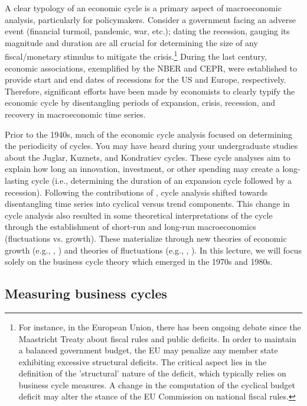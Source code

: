 \documentclass[a4paper,12pt]{article}%
\begin{document}
A clear typology of an economic cycle is a primary aspect of macroeconomic
analysis, particularly for policymakers. Consider a government facing an
adverse event (financial turmoil, pandemic, war, etc.); dating the recession,
gauging its magnitude and duration are all crucial for determining the size of
any fiscal/monetary stimulus to mitigate the crisis.\footnote{For instance, in
the European Union, there has been ongoing debate since the Maastricht Treaty
about fiscal rules and public deficits. In order to maintain a balanced
government budget, the EU may penalize any member state exhibiting excessive
structural deficits. The critical aspect lies in the definition of the
'structural' nature of the deficit, which typically relies on business cycle
measures. A change in the computation of the cyclical budget deficit may
alter the stance of the EU Commission on national fiscal rules.} During the
last century, economic associations, exemplified by the NBER and CEPR, were
established to provide start and end dates of recessions for the US and
Europe, respectively. Therefore, significant efforts have been made by
economists to clearly typify the economic cycle by disentangling periods of
expansion, crisis, recession, and recovery in macroeconomic time series.

Prior to the 1940s, much of the economic cycle analysis focused on determining
the periodicity of cycles. You may have heard during your undergraduate studies
about the Juglar, Kuznets, and Kondratiev cycles. These cycle analyses aim to
explain how long an innovation, investment, or other spending may create a
long-lasting cycle (i.e., determining the duration of an expansion cycle
followed by a recession). Following the contributions of
\cite{burns1946measuring}, cycle analysis shifted towards disentangling time
series into cyclical versus trend components. This change in cycle analysis
also resulted in some theoretical interpretations of the cycle through the
establishment of short-run and long-run macroeconomics (fluctuations vs.
growth). These materialize through new theories of economic growth (e.g.,
\cite{harrod1948towards}, \cite{solow1956contribution}) and theories of
fluctuations (e.g., \cite{keynes2018general}, \cite{samuelson1948foundations}).
In this lecture, we will focus solely on the business cycle theory which
emerged in the 1970s and 1980s.

\subsection{Measuring business cycles}
\end{document}
